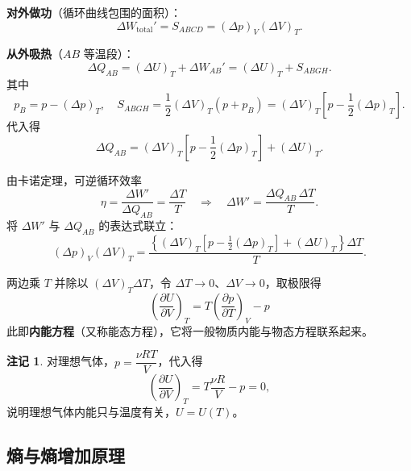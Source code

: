 \documentclass[UTF8]{ctexart}
\theoremstyle{definition}
\newtheorem{remark}{注记}
\begin{document}
\textbf{对外做功}（循环曲线包围的面积）：
\begin{equation}
\Delta W_{\mathrm{total}}'=S_{ABCD}=(\Delta p)_V(\Delta V)_T.
\end{equation}

\textbf{从外吸热}（$AB$ 等温段）：
\begin{equation}
\Delta Q_{AB}=(\Delta U)_T+\Delta W_{AB}'=(\Delta U)_T+S_{ABGH}.
\end{equation}
其中
\begin{equation}
p_B=p-(\Delta p)_T,\quad
S_{ABGH}=\frac{1}{2}(\Delta V)_T(p+p_B)=(\Delta V)_T\left[p-\frac{1}{2}(\Delta p)_T\right].
\end{equation}
代入得
\begin{equation}
\Delta Q_{AB}=(\Delta V)_T\left[p-\frac{1}{2}(\Delta p)_T\right]+(\Delta U)_T.
\end{equation}

由卡诺定理，可逆循环效率
\begin{equation}
\eta=\frac{\Delta W'}{\Delta Q_{AB}}=\frac{\Delta T}{T}
\quad\Rightarrow\quad
\Delta W'=\frac{\Delta Q_{AB}\,\Delta T}{T}.
\end{equation}
将 $\Delta W'$ 与 $\Delta Q_{AB}$ 的表达式联立：
\begin{equation}
(\Delta p)_V(\Delta V)_T=\frac{\left\{(\Delta V)_T\left[p-\frac{1}{2}(\Delta p)_T\right]+(\Delta U)_T\right\}\Delta T}{T}.
\end{equation}

两边乘 $T$ 并除以 $(\Delta V)_T\Delta T$，令 $\Delta T\to 0$、$\Delta V\to 0$，取极限得
\begin{equation}
\boxed{\left(\frac{\partial U}{\partial V}\right)_T=T\left(\frac{\partial p}{\partial T}\right)_V-p}
\end{equation}
此即\textbf{内能方程}（又称能态方程），它将一般物质内能与物态方程联系起来。

\begin{remark}
对理想气体，$p=\dfrac{\nu RT}{V}$，代入得
\begin{equation}
\left(\frac{\partial U}{\partial V}\right)_T=T\frac{\nu R}{V}-p=0,
\end{equation}
说明理想气体内能只与温度有关，$U=U(T)$。
\end{remark}

\subsection{熵与熵增加原理}
\end{document}
